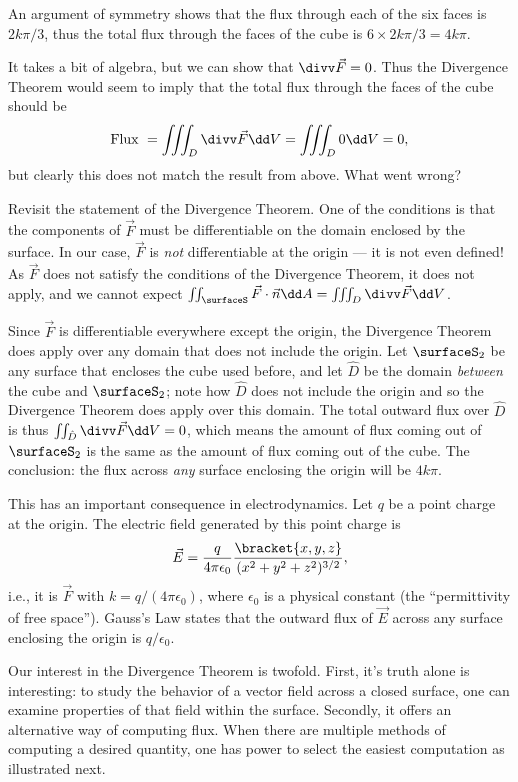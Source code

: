 \begin{example}
An argument of symmetry shows that the flux through each of the six faces is $2k\pi/3$, thus the total flux through the faces of the cube is $6\times2k\pi/3 = 4k\pi$.

It takes a bit of algebra, but we can show that $\divv\vec F = 0$. Thus the Divergence Theorem would seem to imply that the total flux through the faces of the cube should be 
\[\text{Flux }=\iiint_D \divv \vec F\dd V = \iiint_D 0\dd V = 0,\]
but clearly this does not match the result from above. What went wrong?

Revisit the statement of the Divergence Theorem. One of the conditions is that the components of $\vec F$ must be differentiable on the domain enclosed by the surface. In our case, $\vec F$ is \emph{not} differentiable at the origin --- it is not even defined! As $\vec F$ does not satisfy the conditions of the Divergence Theorem, it does not apply, and we cannot expect $\iint_{\surfaceS} \vec F\cdot\vec n\dd A = \iiint_D \divv\vec F\dd V$.

Since $\vec F$ is differentiable everywhere except the origin, the Divergence Theorem does apply over any domain that does not include the origin. Let $\surfaceS_2$ be any surface that encloses the cube used before, and let $\hat D$ be the domain \emph{between} the cube and $\surfaceS_2$; note how $\hat D$ does not include the origin and so the Divergence Theorem does apply over this domain. The total outward flux over $\hat D$ is thus $\iint_{\hat D}\divv \vec F\dd V = 0$, which means the amount of flux coming out of $\surfaceS_2$ is the same as the amount of flux coming out of the cube. The conclusion: the flux across \emph{any} surface enclosing the origin will be $4k\pi$. 

This has an important consequence in electrodynamics. Let $q$ be a point charge at the origin. The electric field generated by this point charge is 
\[\vec E = \frac{q}{4\pi \epsilon_0}\frac{\bracket{x,y,z}}{(x^2+y^2+z^2)^{3/2}},\]
i.e., it is $\vec F$ with $k = q/(4\pi \epsilon_0)$, where $\epsilon_0$ is a physical constant (the ``permittivity of free space''). Gauss's Law states that the outward flux of $\vec E$ across any surface enclosing the origin is $q/\epsilon_0$.
\end{example}

Our interest in the Divergence Theorem is twofold. First, it's truth alone is interesting: to study the behavior of a vector field across a closed surface, one can examine properties of that field within the surface. Secondly, it offers an alternative way of computing flux. When there are multiple methods of computing a desired quantity, one has power to select the easiest computation as illustrated next.

